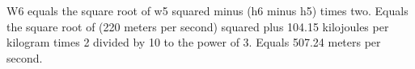 W6 equals the square root of w5 squared minus (h6 minus h5) times two.  
Equals the square root of (220 meters per second) squared plus 104.15 kilojoules per kilogram times 2 divided by 10 to the power of 3.  
Equals 507.24 meters per second.